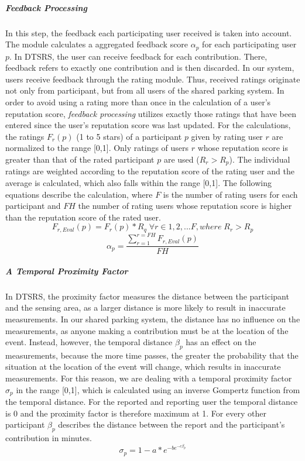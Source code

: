 \documentclass[
a4paper,     %
titlepage,   %
14pt         %
]{scrartcl}  %
\theoremstyle{mystyle}
\begin{document}
\subparagraph{Feedback Processing}In this step, the feedback each participating user received is taken into account. The module calculates a aggregated feedback score $\alpha_p$ for each participating user $p$. In DTSRS, the user can receive feedback for each contribution. There, feedback refers to exactly one contribution and is then discarded. In our system, users receive feedback through the rating module. Thus, received ratings originate not only from participant, but from all users of the shared parking system. In order to avoid using a rating more than once in the calculation of a user's reputation score, \textit{feedback processing} utilizes exactly those ratings that have been entered since the user's reputation score was last updated. For the calculations, the ratings $F_r(p)$ (1 to 5 stars) of a participant $p$ given by rating user $r$ are normalized to the range [0,1]. Only ratings of users $r$ whose reputation score is greater than that of the rated participant $p$ are used ($R_r>R_p$). The individual ratings are weighted according to the reputation score of the rating user and the average is calculated, which also falls within the range [0,1]. The following equations describe the calculation, where $F$ is the number of rating users for each participant and $FH$ the number of rating users whose reputation score is higher than the reputation score of the rated user.
\begin{equation}
  F_{r,Eval}(p)=F_r(p)*R_q\; \forall r \in 1,2,...F, where\; R_r>R_p 
\end{equation}
\begin{equation}
  \alpha_p = \frac{\sum_{r=1}^{r=FH}F_{r,Eval}(p)}{FH}
\end{equation}

\subparagraph{A Temporal Proximity Factor} In DTSRS, the proximity factor measures the distance between the participant and the sensing area, as a larger distance is more likely to result in inaccurate measurements. In our shared parking system, the distance has no influence on the measurements, as anyone making a contribution must be at the location of the event. Instead, however, the temporal distance $\beta_p$ has an effect on the measurements, because the more time passes, the greater the probability that the situation at the location of the event will change, which results in inaccurate measurements. For this reason, we are dealing with a temporal proximity factor $\sigma_p$ in the range [0,1], which is calculated using an inverse Gompertz function from the temporal distance. For the reported and reporting user the temporal distance is 0 and the proximity factor is therefore maximum at 1. For every other participant $\beta_p$ describes the distance between the report and the participant's contribution in minutes.
\begin{equation}
  \sigma_p = 1 - a * e^{-be^{-c\beta_p}}
\end{equation}
\end{document}
